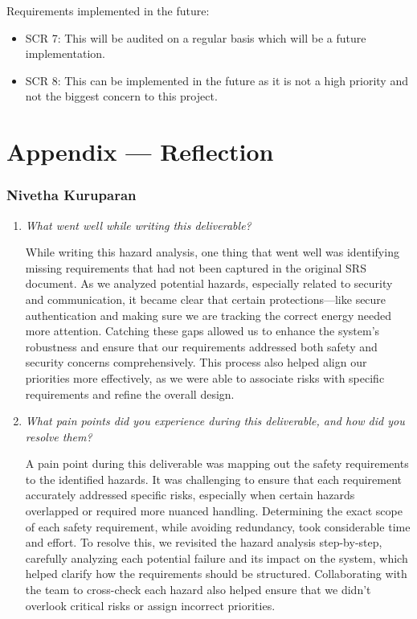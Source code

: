 \documentclass{article}
\newcounter{hazard}
\begin{document}
\medskip

\noindent
Requirements implemented in the future:
\begin{itemize}
    \item SCR 7: This will be audited on a regular basis which will be a future implementation.
    \item SCR 8: This can be implemented in the future as it is not a high priority and not the biggest concern to this project.
\end{itemize}

\newpage{}

\section*{Appendix --- Reflection}

\subsubsection*{Nivetha Kuruparan}

\begin{enumerate}
  \item \textit{What went well while writing this deliverable?}
  
  While writing this hazard analysis, one thing that went well was identifying missing requirements that had not been captured in the original SRS document. As we analyzed potential hazards, especially related to security and communication, it became clear that certain protections—like secure authentication and making sure we are tracking the correct energy needed more attention. Catching these gaps allowed us to enhance the system's robustness and ensure that our requirements addressed both safety and security concerns comprehensively. This process also helped align our priorities more effectively, as we were able to associate risks with specific requirements and refine the overall design.

  \item \textit{What pain points did you experience during this deliverable, and how did you resolve them?}
  
  A pain point during this deliverable was mapping out the safety requirements to the identified hazards. It was challenging to ensure that each requirement accurately addressed specific risks, especially when certain hazards overlapped or required more nuanced handling. Determining the exact scope of each safety requirement, while avoiding redundancy, took considerable time and effort. To resolve this, we revisited the hazard analysis step-by-step, carefully analyzing each potential failure and its impact on the system, which helped clarify how the requirements should be structured. Collaborating with the team to cross-check each hazard also helped ensure that we didn’t overlook critical risks or assign incorrect priorities.

\end{enumerate}
\end{document}
